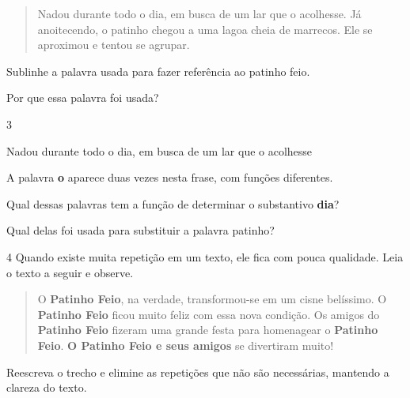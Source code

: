 \begin{escolha}
\begin{escolha}
\begin{quote}
Nadou durante todo o dia, em busca de um lar que o acolhesse. Já
anoitecendo, o patinho chegou a uma lagoa cheia de marrecos. Ele
se aproximou e tentou se agrupar.
\end{quote}

\begin{escolha}
\item Sublinhe a palavra usada para fazer referência ao patinho feio.

\item Por que essa palavra foi usada?

\end{escolha}

\num{3}

\begin{mdframed}[linewidth=10pt,linecolor=salmao!20,backgroundcolor=salmao!20,roundcorner=20pt]
Nadou durante todo o dia, em busca de um lar que o acolhesse
\end{mdframed}

A palavra \textbf{o} aparece duas vezes nesta frase, com funções diferentes.

\begin{escolha}
\item Qual dessas palavras tem a função de determinar o substantivo \textbf{dia}?


\item Qual delas foi usada para substituir a palavra patinho?

\end{escolha}

\num{4} Quando existe muita repetição em um texto, ele fica com pouca
qualidade. Leia o texto a seguir e observe.

\begin{quote}
O \textbf{Patinho Feio}, na verdade, transformou-se em um cisne
belíssimo. O \textbf{Patinho Feio} ficou muito feliz com essa nova
condição. Os amigos do \textbf{Patinho Feio} fizeram uma grande festa
para homenagear o \textbf{Patinho Feio}. \textbf{O Patinho Feio e seus
amigos} se divertiram muito!
\end{quote}

\begin{escolha}
\item Reescreva o trecho e elimine as repetições que não são necessárias,
mantendo a clareza do texto.


\end{escolha}
\end{escolha}
\end{escolha}
